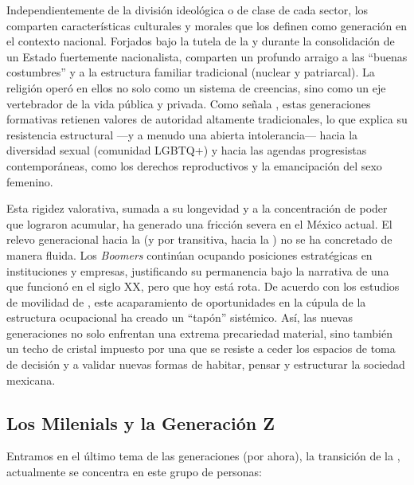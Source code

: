 Independientemente de la división ideológica o de clase de cada sector, los  comparten características culturales y morales que los definen como
generación en el contexto nacional. Forjados bajo la tutela de la  y durante la consolidación de un Estado fuertemente nacionalista,
comparten un profundo arraigo a las ``buenas costumbres'' y a la estructura familiar tradicional (nuclear y patriarcal). La religión operó en ellos no solo como un
sistema de creencias, sino como un eje vertebrador de la vida pública y privada. Como señala \cite{moreno2011generaciones}, estas generaciones formativas retienen valores
de autoridad altamente tradicionales, lo que explica su resistencia estructural ---y a menudo una abierta intolerancia--- hacia la diversidad sexual (comunidad LGBTQ+)
y hacia las agendas progresistas contemporáneas, como los derechos reproductivos y la emancipación del sexo femenino.

Esta rigidez valorativa, sumada a su longevidad y a la concentración de poder que lograron acumular, ha generado una fricción severa en el México actual. El relevo
generacional hacia la  (y por transitiva, hacia la ) no se ha concretado de manera fluida. Los \textit{Boomers} continúan
ocupando posiciones estratégicas en instituciones y empresas, justificando su permanencia bajo la narrativa de una  que funcionó en el siglo XX,
pero que hoy está rota. De acuerdo con los estudios de movilidad de \cite{solis2017desigualdad}, este acaparamiento de oportunidades en la cúpula de la estructura
ocupacional ha creado un ``tapón'' sistémico. Así, las nuevas generaciones no solo enfrentan una extrema precariedad material, sino también un techo de cristal
impuesto por una  que se resiste a ceder los espacios de toma de decisión y a validar nuevas formas de habitar, pensar y estructurar la sociedad mexicana.

\subsection{Los Milenials y la Generación Z}
\label{ssec:milenials-generacion-z}

Entramos en el último tema de las generaciones (por ahora), la transición de la , actualmente se concentra en este grupo de personas:

